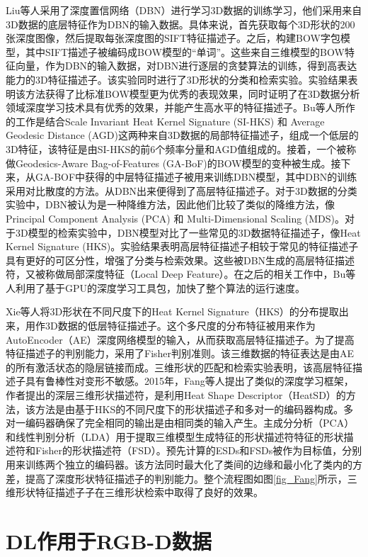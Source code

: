 Liu等人\cite{Liu2014High}采用了深度置信网络（DBN）进行学习3D数据的训练学习，他们采用来自3D数据的底层特征作为DBN的输入数据。具体来说，首先获取每个3D形状的200张深度图像，然后提取每张深度图的SIFT特征描述子。之后，构建BOW字包模型，其中SIFT描述子被编码成BOW模型的``单词''。这些来自三维模型的BOW特征向量，作为DBN的输入数据，对DBN进行逐层的贪婪算法的训练，得到高表达能力的3D特征描述子。该实验同时进行了3D形状的分类和检索实验。实验结果表明该方法获得了比标准BOW模型更为优秀的表现效果，同时证明了在3D数据分析领域深度学习技术具有优秀的效果，并能产生高水平的特征描述子。Bu等人\cite{Bu2014Learning}所作的工作是结合Scale Invariant Heat Kernel Signature (SI-HKS) 和 Average Geodesic Distance (AGD)这两种来自3D数据的局部特征描述子，组成一个低层的3D特征，该特征是由SI-HKS的前6个频率分量和AGD值组成的。接着，一个被称做Geodesics-Aware Bag-of-Features (GA-BoF)的BOW模型的变种被生成。接下来，从GA-BOF中获得的中层特征描述子被用来训练DBN模型，其中DBN的训练采用对比散度的方法。从DBN出来便得到了高层特征描述子。对于3D数据的分类实验中，DBN被认为是一种降维方法，因此他们比较了类似的降维方法，像Principal Component Analysis (PCA) 和 Multi-Dimensional Scaling (MDS)。对于3D模型的检索实验中，DBN模型对比了一些常见的3D数据特征描述子，像Heat Kernel Signature (HKS)。实验结果表明高层特征描述子相较于常见的特征描述子具有更好的可区分性，增强了分类与检索效果。这些被DBN生成的高层特征描述符，又被称做局部深度特征（Local Deep Feature）。在之后的相关工作中，Bu等人利用了基于GPU的深度学习工具包，加快了整个算法的运行速度。

Xie等人\cite{Xie2015Deepshape}将3D形状在不同尺度下的Heat Kernel Signature（HKS）的分布提取出来，用作3D数据的低层特征描述子。这个多尺度的分布特征被用来作为AutoEncoder（AE）深度网络模型的输入，从而获取高层特征描述子。为了提高特征描述子的判别能力，采用了Fisher判别准则。该三维数据的特征表达是由AE的所有激活状态的隐层链接而成。三维形状的匹配和检索实验表明，该高层特征描述子具有鲁棒性对变形不敏感。2015年，Fang等人\cite{Fang20153D}提出了类似的深度学习框架，作者提出的深层三维形状描述符，是利用Heat Shape Descriptor（HeatSD）的方法，该方法是由基于HKS的不同尺度下的形状描述子和多对一的编码器构成。多对一编码器确保了完全相同的输出是由相同类的输入产生。主成分分析（PCA）和线性判别分析（LDA）用于提取三维模型生成特征的形状描述符特征的形状描述符和Fisher的形状描述符（FSD）。预先计算的ESDs和FSDs被作为目标值，分别用来训练两个独立的编码器。该方法同时最大化了类间的边缘和最小化了类内的方差，提高了深度形状特征描述子的判别能力。整个流程图如图\ref{fig_Fang}所示，三维形状特征描述子子在三维形状检索中取得了良好的效果。

\section{DL作用于RGB-D数据}


